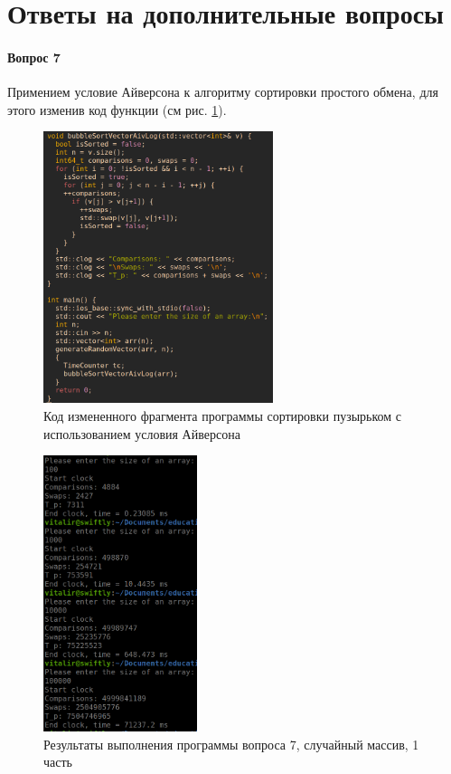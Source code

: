 \documentclass[14pt]{extarticle}
\begin{document}
\section{Ответы на дополнительные вопросы}
\paragraph{Вопрос 7}
Примением условие Айверсона к алгоритму сортировки простого обмена,
для этого изменив код функции (см рис. \ref{fig:alg3_code_aiv}).
\begin{figure}[htpb]
  \centering
  \includegraphics[width=0.6\textwidth]{pictures/alg3_code_aiv.png}
  \caption{Код измененного фрагмента программы сортировки пузырьком с использованием
  условия Айверсона}
  \label{fig:alg3_code_aiv}
\end{figure}

\newpage
\begin{figure}[htpb]
  \centering
  \includegraphics[width=0.4\textwidth]{pictures/alg1_aiv_speed1.png}
  \caption{Результаты выполнения программы вопроса 7, случайный массив, 1 часть}
  \label{fig:qs7_speed1}
\end{figure}
\end{document}
